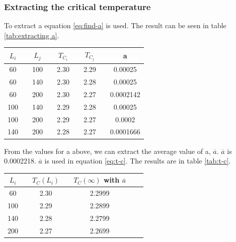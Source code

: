 \pagebreak
\subsubsection{Extracting the critical temperature}


To extract a equation \ref{eq:find-a} is used. The result can be seen in table \ref{tab:extracting a}.

\begin{center}
\label{tab:extracting a}
\begin{tabularx}{\textwidth}{c X c X c X c X c}
    \hline 
    \hline 
        $L_i$ && $L_j$ && $T_{C_i}$ && $T_{C_j}$ && a\\ 
    \hline
        60      &&      100     &&  2.30  &&  2.29  && 0.00025 \\
        60      &&      140     &&  2.30  &&  2.28  && 0.00025 \\
        60      &&      200     &&  2.30  &&  2.27  && 0.0002142 \\
        100     &&      140     &&  2.29  &&  2.28  && 0.00025 \\
        100     &&      200     &&  2.29  &&  2.27  && 0.0002 \\
        140     &&      200     &&  2.28  &&  2.27  && 0.0001666 \\
    \hline
\end{tabularx}
\end{center}

From the values for a above, we can extract the average value of a, $\overline{a}$.
 $\overline{a}$ is 0.0002218. $\overline{a}$ is used in equation \ref{eq:t-c}. The results are in table \ref{tab:t-c}.

\begin{center}
\label{tab:t-c}
\begin{tabularx}{\textwidth}{c X c X c X c }
    \hline 
    \hline 
        $L_i$ && $T_C(L_i)$ && $T_C(\infty)$ with $\overline{a}$ \\ 
    \hline
        60      &&  2.30  && 2.2999\\
        100     &&  2.29  && 2.2899\\
        140     &&  2.28  && 2.2799\\
        200     &&  2.27  && 2.2699\\
    \hline
\end{tabularx}
\end{center}

